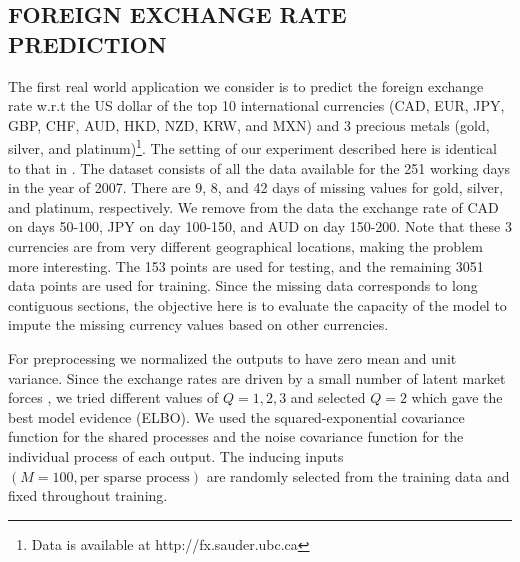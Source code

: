 \subsection{FOREIGN EXCHANGE RATE PREDICTION}
The first real world application we consider is to predict the foreign exchange rate w.r.t the US dollar of the top 10 international currencies (CAD, EUR, JPY, GBP, CHF, AUD, HKD, NZD, KRW, and MXN) and 3 precious metals (gold, silver, and platinum)\footnote{Data is available at http://fx.sauder.ubc.ca}. 
The setting of our experiment described here is identical to that in \citep{alvarez2010efficient}.
The dataset consists of all the data available for the 251 working days in the year of 2007.
There are 9, 8, and 42 days of missing values  for gold, silver, and platinum, respectively.
We remove from the data the exchange rate of CAD on days 50-100, JPY on day 100-150, and AUD on day 150-200.
Note that these 3 currencies are from very different geographical locations, making the problem more interesting. 
The 153 points are used for testing, and the remaining 3051 data points are used for training.
Since the missing data corresponds to long contiguous sections, the objective here is to evaluate the capacity of the model to impute the missing currency values based on other currencies.

For preprocessing we normalized the outputs to have zero mean and unit variance.
Since the exchange rates are driven by a small number of latent market forces \citep[see e.g.][]{alvarez2010efficient}, we tried different values of $Q = {1,2,3}$ and selected $Q = 2$ which gave the best model evidence (ELBO).
We used the squared-exponential covariance function for the shared processes and the noise covariance function for the individual process of each output.
The inducing inputs $(M = 100, \text{per sparse process})$  are randomly selected from the training data and fixed throughout training.

